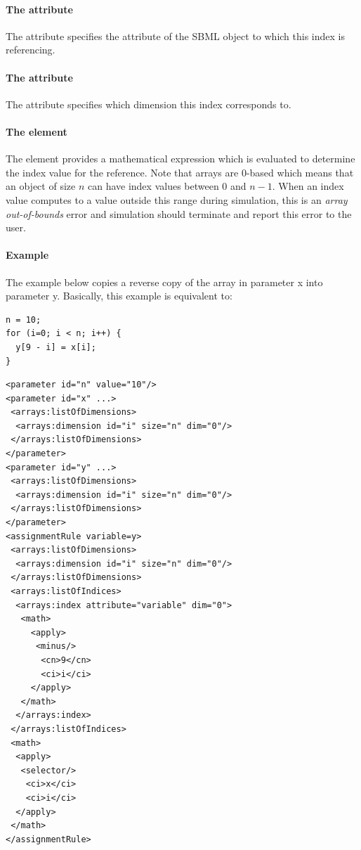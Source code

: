 \paragraph{The  attribute}

The  attribute specifies the attribute of the SBML object to which this index is referencing.  

\paragraph{The  attribute}

The  attribute specifies which dimension this index corresponds to.

\paragraph{The  element}

The  element provides a mathematical expression which is evaluated to determine the index value for the reference.  Note that arrays are 0-based which means that an object of size $n$ can have index values between 0 and $n-1$.  When an index value computes to a value outside this range during simulation, this is an \emph{array out-of-bounds} error and simulation should terminate and report this error to the user.

\paragraph{Example}

The example below copies a reverse copy of the array in parameter x into parameter y.  Basically, this example is equivalent to:
\begin{verbatim}
n = 10;
for (i=0; i < n; i++) {
  y[9 - i] = x[i];
}
\end{verbatim}

\begin{verbatim} 
<parameter id="n" value="10"/>
<parameter id="x" ...>
 <arrays:listOfDimensions>
  <arrays:dimension id="i" size="n" dim="0"/>
 </arrays:listOfDimensions>
</parameter>
<parameter id="y" ...>
 <arrays:listOfDimensions>
  <arrays:dimension id="i" size="n" dim="0"/>
 </arrays:listOfDimensions>
</parameter>
<assignmentRule variable=y>
 <arrays:listOfDimensions>
  <arrays:dimension id="i" size="n" dim="0"/>
 </arrays:listOfDimensions>
 <arrays:listOfIndices>
  <arrays:index attribute="variable" dim="0">
   <math>
     <apply>
      <minus/>
       <cn>9</cn>
       <ci>i</ci>
     </apply>
   </math>
  </arrays:index>
 </arrays:listOfIndices>
 <math>
  <apply>
   <selector/>
    <ci>x</ci>
    <ci>i</ci>
  </apply>
 </math> 
</assignmentRule>
\end{verbatim}

